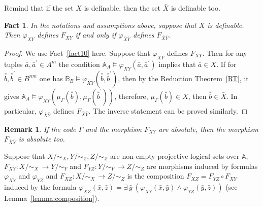 \documentclass[12pt]{article}
\newtheorem{fact}{Fact}
\newtheorem{remark}{Remark}
\theoremstyle{definition}
\def\MA{{\mathbb{A}}}
\def\MB{{\mathbb{B}}}
\begin{document}
Remind that if the set $X$ is definable, then the set $\bar X$ is definable too.
 
\begin{fact}\label{fact9}
In the notations and assumptions above, suppose that $X$ is definable. Then $\varphi_{XY}$ defines $F_{XY}$ if and only if $\varphi_{\bar X\bar Y}$ defines $F_{\bar X\bar Y}$.
\end{fact}

\begin{proof}
We use Fact~\ref {fact10} here. Suppose that $\varphi_{XY}$ defines $F_{XY}$. Then for any tuples $\bar a,\bar a^\prime\in A^m$ the condition $\MA_A\models\varphi_{XY}(\bar a,\bar a^\prime)$ implies that $\bar a\in X$. If for $\bar{\bar b},\bar{\bar b}^\prime\in B^{nm}$ one has $\MB_B\models\varphi_{\bar X\bar Y}(\bar{\bar b},\bar{\bar b}^\prime)$, then by the Reduction Theorem~\ref{RT}, it gives $\MA_A\models\varphi_{XY}(\mu_\Gamma(\bar{\bar b}),\mu_\Gamma(\bar{\bar b}^\prime))$, therefore, $\mu_\Gamma(\bar{\bar b})\in X$, then $\bar{\bar b}\in \bar X$. In particular, $\varphi_{\bar X\bar Y}$ defines $F_{\bar X\bar Y}$. The inverse statement can be proved similarly.
\end{proof}

\begin{remark}
If the code $\Gamma$ and the morphism $F_{XY}$ are absolute, then the morphism $F_{\bar X \bar Y}$ is absolute too.
\end{remark}

Suppose that $X/{\sim_X}, Y/{\sim_Z}, Z/{\sim_Z}$ are non-empty projective logical sets over $\MA$, $F_{XY}\colon X/{\sim_X}\, \to Y/{\sim_Y}$ and $F_{YZ}\colon Y/{\sim_Y}\, \to Z/{\sim_Z}$ are morphisms induced by formulas $\varphi_{XY}$ and $\varphi_{YZ}$ and $F_{XZ}\colon X/{\sim_X}\, \to Z/{\sim_Z}$ is the composition $F_{XZ}=F_{YZ}\circ F_{XY}$ induced by the formula $\varphi_{XZ}(\bar x,\bar z)=\exists\,\bar y \:(\varphi_{XY}(\bar x,\bar y) \wedge \varphi_{YZ}(\bar y,\bar z))$ (see Lemma~\ref{lemma:composition}).
\end{document}
